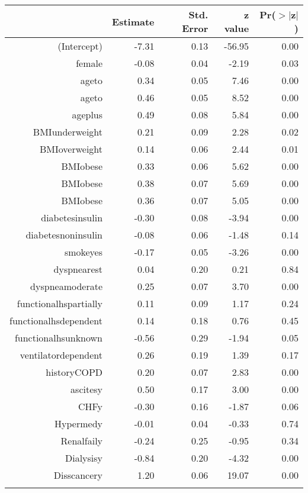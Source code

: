 \bigskip\bigskip
\centering
\begin{tabular}{rrrrr}
  \hline
 & Estimate & Std. Error & z value & Pr($>$$|$z$|$) \\ 
  \hline
(Intercept) & -7.31 & 0.13 & -56.95 & 0.00 \\ 
  female & -0.08 & 0.04 & -2.19 & 0.03 \\ 
  age\-65\-to\-74 & 0.34 & 0.05 & 7.46 & 0.00 \\ 
  age\-75\-to\-84 & 0.46 & 0.05 & 8.52 & 0.00 \\ 
  age\-85\-plus & 0.49 & 0.08 & 5.84 & 0.00 \\ 
  BMI\-underweight & 0.21 & 0.09 & 2.28 & 0.02 \\ 
  BMI\-overweight & 0.14 & 0.06 & 2.44 & 0.01 \\ 
  BMI\-obese\-1 & 0.33 & 0.06 & 5.62 & 0.00 \\ 
  BMI\-obese\-2 & 0.38 & 0.07 & 5.69 & 0.00 \\ 
  BMI\-obese\-3 & 0.36 & 0.07 & 5.05 & 0.00 \\ 
  diabetes\-insulin & -0.30 & 0.08 & -3.94 & 0.00 \\ 
  diabetes\-noninsulin & -0.08 & 0.06 & -1.48 & 0.14 \\ 
  smoke\-yes & -0.17 & 0.05 & -3.26 & 0.00 \\ 
  dyspnea\-rest & 0.04 & 0.20 & 0.21 & 0.84 \\ 
  dyspnea\-moderate & 0.25 & 0.07 & 3.70 & 0.00 \\ 
  functional\-hs\-partially & 0.11 & 0.09 & 1.17 & 0.24 \\ 
  functional\-hs\-dependent & 0.14 & 0.18 & 0.76 & 0.45 \\ 
  functional\-hs\-unknown & -0.56 & 0.29 & -1.94 & 0.05 \\ 
  ventilator\-dependent & 0.26 & 0.19 & 1.39 & 0.17 \\ 
  history\-COPD & 0.20 & 0.07 & 2.83 & 0.00 \\ 
  ascites\-y & 0.50 & 0.17 & 3.00 & 0.00 \\ 
  CHF\-y & -0.30 & 0.16 & -1.87 & 0.06 \\ 
  Hyper\-med\-y & -0.01 & 0.04 & -0.33 & 0.74 \\ 
  Renal\-fail\-y & -0.24 & 0.25 & -0.95 & 0.34 \\ 
  Dialysis\-y & -0.84 & 0.20 & -4.32 & 0.00 \\ 
  Diss\-cancer\-y & 1.20 & 0.06 & 19.07 & 0.00 \\ 
$$
\end{tabular}
